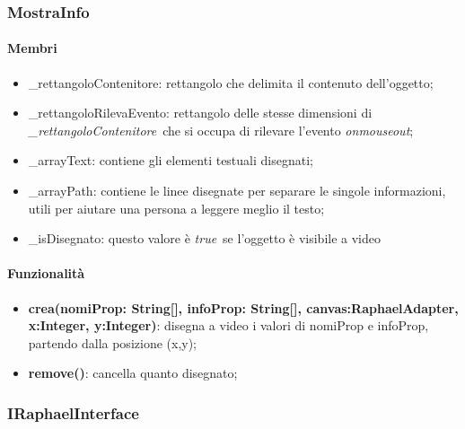 \subsubsection{MostraInfo}
\paragraph{Membri}
\begin{itemize}
\item \_rettangoloContenitore: rettangolo che delimita il contenuto dell'oggetto;
\item \_rettangoloRilevaEvento: rettangolo delle stesse dimensioni di \textit{\_rettangoloContenitore}\ che si occupa di rilevare l'evento \textit{onmouseout};
\item \_arrayText: contiene gli elementi testuali disegnati;
\item \_arrayPath: contiene le linee disegnate per separare le singole informazioni, utili per aiutare una persona a leggere meglio il testo;
\item \_isDisegnato: questo valore è \textit{true}\ se l'oggetto è visibile a video
\end{itemize}
\paragraph{Funzionalità}
\begin{itemize}
\item \textbf{crea(nomiProp: String[], infoProp: String[], canvas:RaphaelAdapter, x:Integer, y:Integer)}: disegna a video i valori di nomiProp e infoProp, partendo dalla posizione (x,y);
\item \textbf{remove()}: cancella quanto disegnato;
\end{itemize}
\subsubsection{IRaphaelInterface}
